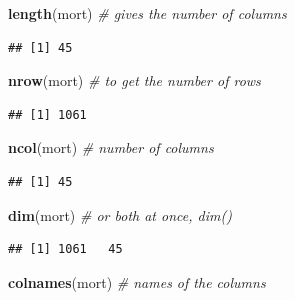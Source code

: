 \documentclass[
]{book}
\newenvironment{Shaded}{\begin{snugshade}}{\end{snugshade}}
\newcommand{\CommentTok}[1]{\textcolor[rgb]{0.56,0.35,0.01}{\textit{#1}}}
\newcommand{\FunctionTok}[1]{\textcolor[rgb]{0.13,0.29,0.53}{\textbf{#1}}}
\newcommand{\NormalTok}[1]{#1}
\begin{document}
\begin{Shaded}
\begin{Highlighting}[]
\FunctionTok{length}\NormalTok{(mort) }\CommentTok{\# gives the number of columns}
\end{Highlighting}
\end{Shaded}

\begin{verbatim}
## [1] 45
\end{verbatim}

\begin{Shaded}
\begin{Highlighting}[]
\FunctionTok{nrow}\NormalTok{(mort) }\CommentTok{\# to get the number of rows}
\end{Highlighting}
\end{Shaded}

\begin{verbatim}
## [1] 1061
\end{verbatim}

\begin{Shaded}
\begin{Highlighting}[]
\FunctionTok{ncol}\NormalTok{(mort) }\CommentTok{\# number of columns}
\end{Highlighting}
\end{Shaded}

\begin{verbatim}
## [1] 45
\end{verbatim}

\begin{Shaded}
\begin{Highlighting}[]
\FunctionTok{dim}\NormalTok{(mort) }\CommentTok{\# or both at once, dim()}
\end{Highlighting}
\end{Shaded}

\begin{verbatim}
## [1] 1061   45
\end{verbatim}

\begin{Shaded}
\begin{Highlighting}[]
\FunctionTok{colnames}\NormalTok{(mort) }\CommentTok{\# names of the columns}
\end{Highlighting}
\end{Shaded}
\end{document}
